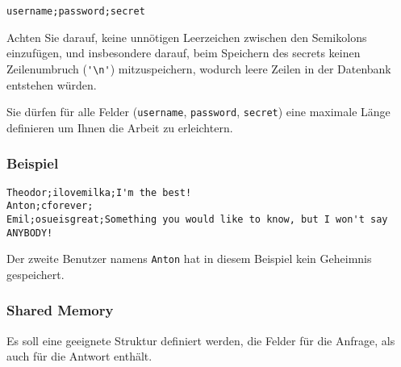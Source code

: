 \begin{verbatim}
username;password;secret
\end{verbatim}

Achten Sie darauf, keine unnötigen Leerzeichen zwischen den Semikolons
einzufügen, und insbesondere darauf, beim Speichern des secrets keinen
Zeilenumbruch (\verb|'\n'|) mitzuspeichern, wodurch leere Zeilen in der
Datenbank entstehen würden.

Sie dürfen für alle Felder (\texttt{username}, \texttt{password},
\texttt{secret}) eine maximale Länge definieren um Ihnen die Arbeit zu
erleichtern.

\subsubsection*{Beispiel}

\begin{verbatim}
Theodor;ilovemilka;I'm the best!
Anton;cforever;
Emil;osueisgreat;Something you would like to know, but I won't say ANYBODY!
\end{verbatim}

Der zweite Benutzer namens \texttt{Anton} hat in diesem Beispiel kein Geheimnis
gespeichert.


\subsubsection*{Shared Memory}

Es soll eine geeignete Struktur definiert werden, die Felder für die Anfrage,
als auch für die Antwort enthält.


\osueguidelinesthree


